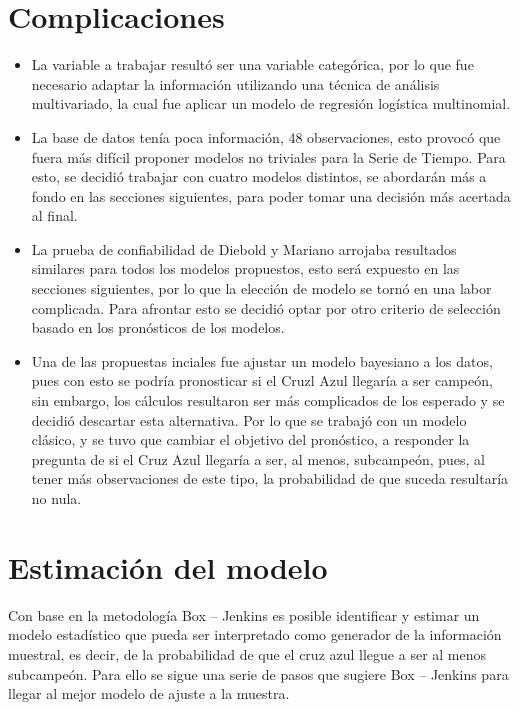 \documentclass{article}
\theoremstyle{remark}
\begin{document}
\section{Complicaciones}
\begin{itemize}
    \item La variable a trabajar resultó ser una variable categórica, por lo que fue necesario adaptar la información utilizando una técnica de análisis multivariado, la cual fue aplicar un modelo de regresión logística multinomial.
    \item La base de datos tenía poca información, 48 observaciones, esto provocó que fuera más difícil proponer modelos no triviales para la Serie de Tiempo. Para esto, se decidió trabajar con cuatro modelos distintos, se abordarán más a fondo en las secciones siguientes, para poder tomar una decisión más acertada al final.
    \item La prueba de confiabilidad de Diebold y Mariano arrojaba resultados similares para todos los modelos propuestos, esto será expuesto en las secciones siguientes, por lo que la elección de modelo se tornó en una labor complicada. Para afrontar esto se decidió optar por otro criterio de selección basado en los pronósticos de los modelos. 
    \item Una de las propuestas inciales fue ajustar un modelo bayesiano a los datos, pues con esto se podría pronosticar si el Cruzl Azul llegaría a ser campeón, sin embargo, los cálculos resultaron ser más complicados de los esperado y se decidió descartar esta alternativa. Por lo que se trabajó con un modelo clásico, y se tuvo que cambiar el objetivo del pronóstico, a responder la pregunta de si el Cruz Azul llegaría a ser, al menos, subcampeón, pues, al tener más observaciones de este tipo, la probabilidad de que suceda resultaría no nula. 
    \end{itemize}
\newpage
\section{Estimación del modelo}
Con base en la metodología Box – Jenkins es posible identificar y estimar un modelo estadístico que pueda ser interpretado como generador de la información muestral, es decir, de la probabilidad de que el cruz azul llegue a ser al menos subcampeón. Para ello se sigue una serie de pasos que sugiere Box – Jenkins para llegar al mejor modelo de ajuste a la muestra. \\
\end{document}
